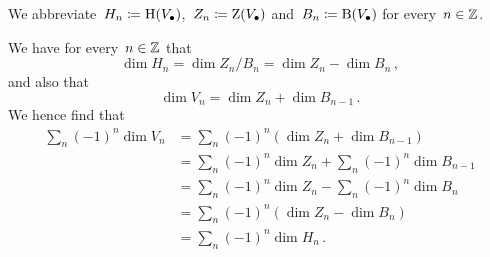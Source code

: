 \section{}
We abbreviate~$H_n \coloneqq \operatorname{H}(V_\bullet)$,~$Z_n \coloneqq \operatorname{Z}(V_\bullet)$ and~$B_n \coloneqq \operatorname{B}(V_\bullet)$ for every~$n \in \mathbb{Z}$.

We have for every~$n \in \mathbb{Z}$ that
\[
    \dim H_n
  = \dim Z_n/B_n
  = \dim Z_n - \dim B_n \,,
\]
and also that
\[
    \dim V_n
  = \dim Z_n + \dim B_{n-1} \,.
\]
We hence find that
\begin{align*}
      \sum_n (-1)^n \dim V_n
  &=  \sum_n (-1)^n (\dim Z_n + \dim B_{n-1}) \\
  &=  \sum_n (-1)^n \dim Z_n + \sum_n (-1)^n \dim B_{n-1} \\
  &=  \sum_n (-1)^n \dim Z_n - \sum_n (-1)^n \dim B_n \\
  &=  \sum_n (-1)^n (\dim Z_n - \dim B_n) \\
  &=  \sum_n (-1)^n \dim H_n \,.
\end{align*}




